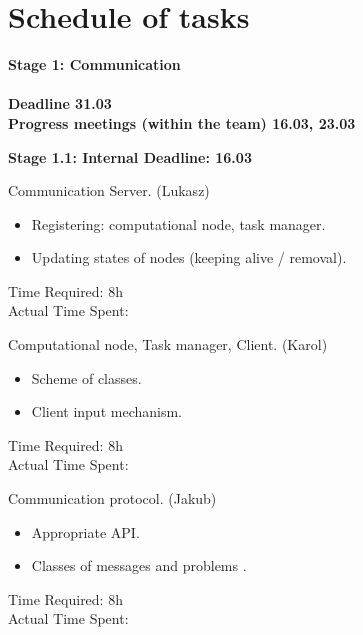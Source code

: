 \documentclass{article}
\begin{document}
\section{Schedule of tasks}

\begin{itemize}
{\item \large \bf Stage 1: Communication \\ \\ 
	Deadline 31.03 \\
	Progress meetings (within the team) 16.03, 23.03 }
	
	\begin{itemize}

			{\item \large \bf Stage 1.1: Internal Deadline: 16.03 }
			
			\begin{enumerate}
			
					{\bf \item Communication Server. (Lukasz) }
					\begin{itemize} [label=$\bullet$]
							\item Registering: computational node,
							 task manager.
							\item Updating states of nodes (keeping alive / removal).		
					\end{itemize}
					Time Required: 8h \\ 
					Actual Time Spent: \\
					
					{\bf \item Computational node, Task manager, Client. (Karol)}
					\begin{itemize} [label=$\bullet$]
							\item Scheme of classes.
							\item Client input mechanism.
					\end{itemize}		
					Time Required: 8h \\ 
					Actual Time Spent: \\
			
			
					{\bf \item Communication protocol. (Jakub)}
					\begin{itemize} [label=$\bullet$]
							\item Appropriate API.
							\item Classes of messages and problems	.
					\end{itemize}
					Time Required: 8h \\ 
					Actual Time Spent: \\
			

\end{enumerate}
\end{itemize}
\end{itemize}
\end{document}
